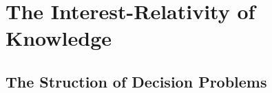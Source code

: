 


%
%

\section{The Interest-Relativity of Knowledge}

\subsection{The Struction of Decision Problems}

